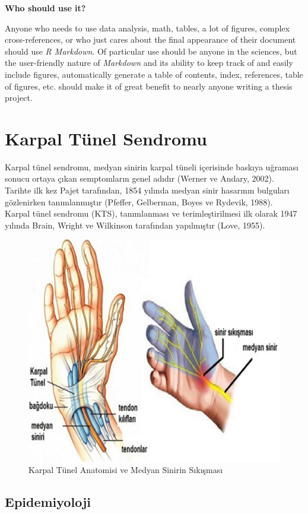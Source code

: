 \documentclass[12pt,twoside]{deuthesis}
\begin{document}
\textbf{Who should use it?}

Anyone who needs to use data analysis, math, tables, a lot of figures, complex cross-references, or who just cares about the final appearance of their document should use \emph{R Markdown}. Of particular use should be anyone in the sciences, but the user-friendly nature of \emph{Markdown} and its ability to keep track of and easily include figures, automatically generate a table of contents, index, references, table of figures, etc. should make it of great benefit to nearly anyone writing a thesis project.

\hypertarget{KTSTanim}{%
\chapter{Karpal Tünel Sendromu}\label{KTSTanim}}

Karpal tünel sendromu, medyan sinirin karpal tüneli içerisinde baskıya uğraması sonucu ortaya çıkan semptomların genel adıdır (Werner ve Andary, 2002).\\
Tarihte ilk kez Pajet tarafından, 1854 yılında medyan sinir hasarının bulguları gözlenirken tanımlanmıştır (Pfeffer, Gelberman, Boyes ve Rydevik, 1988).\\
Karpal tünel sendromu (KTS), tanımlanması ve terimleştirilmesi ilk olarak 1947 yılında Brain, Wright ve Wilkinson tarafından yapılmıştır (Love, 1955).
\begin{figure}

{\centering \includegraphics[width=4.72in]{figure/karpal_tunnel} 

}

\caption{Karpal Tünel Anatomisi ve Medyan Sinirin Sıkışması}\label{fig:unnamed-chunk-1}
\end{figure}
\hypertarget{KTSEpidemiyoloji}{%
\section{Epidemiyoloji}\label{KTSEpidemiyoloji}}
\end{document}
